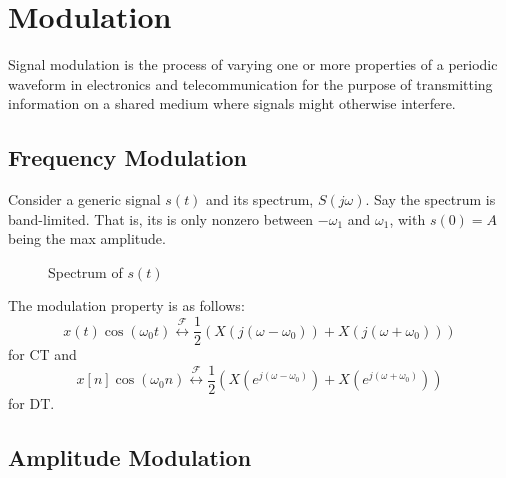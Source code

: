 \section{Modulation}
Signal modulation is the process of varying one or more properties of
a periodic waveform in electronics and telecommunication for the
purpose of transmitting information on a shared medium where signals might
otherwise interfere.
\subsection{Frequency Modulation}
Consider a generic signal $s(t)$ and its spectrum, $S(j\omega)$. Say
the spectrum is band-limited. That is, its is only nonzero between
$-\omega_1$ and $\omega_1$, with $s(0) = A$ being the max amplitude.
\begin{figure}
    \caption{Spectrum of $s(t)$}
\end{figure}

The modulation property is as follows:
\begin{equation}
    x(t)\cos(\omega_0 t) \overset{\mathcal{F}}{\leftrightarrow} \frac{1}{2}\left( X(j(\omega-\omega_0)) + X(j(\omega+\omega_0))\right)
\end{equation}
for CT and
\begin{equation}
    x[n]\cos(\omega_0 n)  \overset{\mathcal{F}}{\leftrightarrow}  \frac{1}{2}\left( X(e^{j(\omega-\omega_0)}) + X(e^{j(\omega+\omega_0)})\right)
\end{equation}
for DT.


\subsection{Amplitude Modulation}